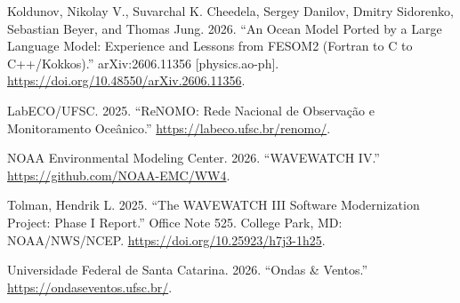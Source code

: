 \documentclass[10pt,a4paper,]{article}
\newlength{\cslhangindent}
\newenvironment{CSLReferences}[2] %
 {\small\begin{list}{}{%
  \setlength{\itemindent}{0pt}
  \setlength{\leftmargin}{0pt}
  \setlength{\parsep}{0pt}
  \ifodd #1
   \setlength{\leftmargin}{\cslhangindent}
   \setlength{\itemindent}{-1\cslhangindent}
  \fi
  \setlength{\itemsep}{#2\baselineskip}}}
 {\end{list}}
\begin{document}
\begin{CSLReferences}{1}{0}
Koldunov, Nikolay V., Suvarchal K. Cheedela, Sergey Danilov, Dmitry
Sidorenko, Sebastian Beyer, and Thomas Jung. 2026. {``An Ocean Model
Ported by a Large Language Model: Experience and Lessons from {FESOM2}
({Fortran} to {C} to {C++/Kokkos}).''} arXiv:2606.11356
{[}physics.ao-ph{]}. \url{https://doi.org/10.48550/arXiv.2606.11356}.

LabECO/UFSC. 2025. {``{ReNOMO}: Rede Nacional de Observação e
Monitoramento Oceânico.''} \url{https://labeco.ufsc.br/renomo/}.

NOAA Environmental Modeling Center. 2026. {``{WAVEWATCH IV}.''}
\url{https://github.com/NOAA-EMC/WW4}.

Tolman, Hendrik L. 2025. {``The {WAVEWATCH III} Software Modernization
Project: Phase {I} Report.''} Office Note 525. College Park, MD:
NOAA/NWS/NCEP. \url{https://doi.org/10.25923/h7j3-1h25}.

Universidade Federal de Santa Catarina. 2026. {``Ondas \& Ventos.''}
\url{https://ondaseventos.ufsc.br/}.

\end{CSLReferences}
\end{document}
